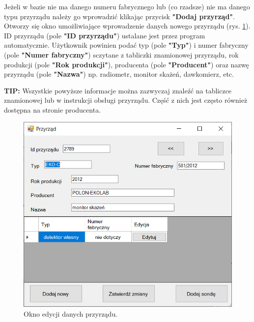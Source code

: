 Jeżeli w bazie nie ma danego numeru fabrycznego lub (co rzadsze) nie ma danego typu przyrządu należy go wprowadzić klikając przycisk \textbf{"Dodaj przyrząd"}. Otworzy się okno umożliwiające wprowadzenie danych nowego przyrządu (rys. \ref{edytujPrzyrzad}). ID przyrządu  (pole \textbf{"ID przyrządu"}) ustalane jest przez program automatycznie. Użytkownik powinien podać typ (pole \textbf{"Typ"}) i numer fabryczny (pole \textbf{"Numer fabryczny"}) sczytane z tabliczki znamionowej przyrządu, rok produkcji (pole \textbf{"Rok produkcji"}), producenta (pole \textbf{"Producent"}) oraz nazwę przyrządu (pole \textbf{"Nazwa"}) np. radiometr, monitor skażeń, dawkomierz, etc.

\textbf{TIP:} Wszystkie powyższe informacje można zazwyczaj znaleźć na tabliczce znamionowej lub w instrukcji obsługi przyrządu. Część z nich jest często również dostępna na stronie producenta.

\begin{figure}[htb]
	\centering
	\includegraphics{obrazki/Biuro/karta/edytuj_przyrzad.png}
	\caption{Okno edycji danych przyrządu.}
	\label{edytujPrzyrzad}
\end{figure}

